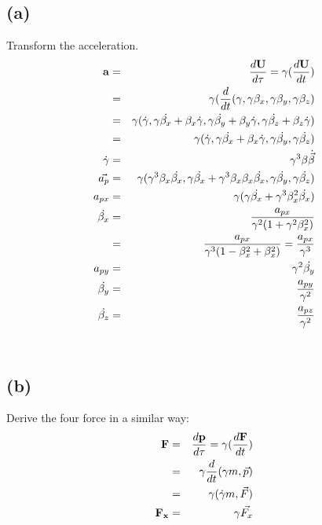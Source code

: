 \documentclass[11pt]{amsart}
\begin{document}
\subsection*{(a)} Transform the acceleration. 
\begin{eqnarray*}
\bold{a} &=& \frac{d\bold{U}}{d\tau} = \gamma(\frac{d\bold{U}}{dt}) \\
&=& \gamma(\frac{d}{dt}(\gamma, \gamma\beta_{x}, \gamma\beta_{y}, \gamma\beta_{z}) \\
&=& \gamma(\dot{\gamma}, \gamma\dot{\beta_{x}}+\beta_{x}\dot{\gamma}, \gamma\dot{\beta_{y}}+\beta_{y}\dot{\gamma}, \gamma\dot{\beta_{z}}+\beta_{z}\dot{\gamma}) \\
&=& \gamma(\dot{\gamma}, \gamma\dot{\beta_{x}}+\beta_{x}\dot{\gamma}, \gamma\dot{\beta_{y}}, \gamma\dot{\beta_{z}}) \\
\dot{\gamma} &=& \gamma^{3}\beta\dot{\vec{\beta}} \\
\vec{a_{p}} &=& \gamma(\gamma^{3}\beta_{x}\dot{\beta_{x}}, \gamma\dot{\beta_{x}}+\gamma^{3}\beta_{x}\beta_{x}\dot{\beta_{x}}, \gamma\dot{\beta_{y}}, \gamma\dot{\beta_{z}}) \\
a_{px} &=& \gamma(\gamma\dot{\beta_{x}}+\gamma^{3}\beta_{x}^{2}\dot{\beta_{x}}) \\
\dot{\beta_{x}} &=& \frac{a_{px}}{\gamma^{2}(1+\gamma^{2}\beta_{x}^{2})} \\
&=& \frac{a_{px}}{\gamma^{3}(1-\beta_{x}^{2}+\beta_{x}^{2})} = \frac{a_{px}}{\gamma^{3}} \\
a_{py} &=& \gamma^{2}\dot{\beta_{y}} \\
\dot{\beta_{y}} &=& \frac{a_{py}}{\gamma^{2}} \\
\dot{\beta_{z}} &=& \frac{a_{pz}}{\gamma^{2}} 
\end{eqnarray*} \\
\subsection*{(b)} Derive the four force in a similar way: \\
\begin{eqnarray*}
\bold{F} &=& \frac{d\bold{p}}{d\tau} = \gamma(\frac{d\bold{F}}{dt}) \\
&=& \gamma\frac{d}{dt}(\gamma{m}, \vec{p}) \\
&=& \gamma(\dot{\gamma}m, \vec{F}) \\
\bold{F_{x}} &=& \gamma\vec{F_{x}} 
\end{eqnarray*} \\
\end{document}
